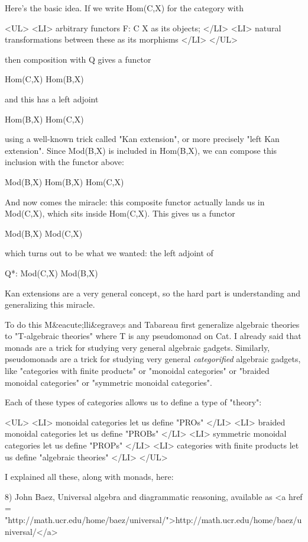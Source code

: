 Here's the basic idea.  If we write Hom(C,X) for the category with

<UL>
<LI>
arbitrary functors F: C \to  X as its objects;
</LI>
<LI> natural transformations between these as its morphisms
</LI>
</UL>

then composition with Q gives a functor

Hom(C,X) \to  Hom(B,X)

and this has a left adjoint 

Hom(B,X) \to  Hom(C,X)

using a well-known trick called "Kan extension", or more
precisely "left Kan extension".  Since Mod(B,X) is included in
Hom(B,X), we can compose this inclusion with the functor above:

Mod(B,X) \to  Hom(B,X) \to  Hom(C,X)

And now comes the miracle: this composite functor actually lands us
in Mod(C,X), which sits inside Hom(C,X).  This gives us a functor

Mod(B,X) \to  Mod(C,X)

which turns out to be what we wanted: the left adjoint of 

Q*: Mod(C,X) \to  Mod(B,X)

Kan extensions are a very general concept, so the hard part is
understanding and generalizing this miracle.

To do this M&eacute;lli&egrave;s and Tabareau first generalize
algebraic theories to "T-algebraic theories" where T is any
pseudomonad on Cat.  I already said that monads are a trick for
studying very general algebraic gadgets.  Similarly, pseudomonads are
a trick for studying very general \emph{categorified} algebraic
gadgets, like "categories with finite products" or
"monoidal categories" or "braided monoidal
categories" or "symmetric monoidal categories".

Each of these types of categories allows us to define a type of
"theory":

<UL>
<LI>
monoidal categories let us define "PROs"
</LI>
<LI>
braided monoidal categories let us define "PROBs"
</LI>
<LI>
symmetric monoidal categories let us define "PROPs"
</LI>
<LI>
categories with finite products let us define "algebraic theories"
</LI>
</UL>

I explained all these, along with monads, here:

8) John Baez, Universal algebra and diagrammatic reasoning, available
as <a href = "http://math.ucr.edu/home/baez/universal/">http://math.ucr.edu/home/baez/universal/</a>

